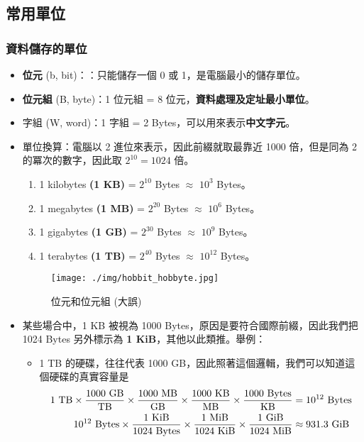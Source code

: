 \documentclass[12pt,a4paper,oneside]{report}
\begin{document}
\begin{CJK}{UTF8}{bkai}
\subsection{常用單位}
\subsubsection{資料儲存的單位}
\begin{itemize}
\item \textbf{位元} (b, bit)：：只能儲存一個 0 或 1，是電腦最小的儲存單位。
\item \textbf{位元組} (B, byte)：1 位元組 = 8 位元，\textbf{資料處理及定址最小單位}。
\item 字組 (W, word)：1 字組 = 2 Bytes，可以用來表示\textbf{中文字元}。
\item 單位換算：電腦以 2 進位來表示，因此前綴就取最靠近 1000 倍，但是同為 2 的冪次的數字，因此取 $ 2^{10} = 1024$ 倍。
  \begin{enumerate}
  \item 1 kilobytes \textbf{(1 KB)} = $2^{10}$ Bytes $\approx$ $10^{3}$ Bytes。
  \item 1 megabytes \textbf{(1 MB)} = $2^{20}$ Bytes $\approx$ $10^{6}$ Bytes。
  \item 1 gigabytes \textbf{(1 GB)} = $2^{30}$ Bytes $\approx$ $10^{9}$ Bytes。
  \item 1 terabytes \textbf{(1 TB)} = $2^{40}$ Bytes $\approx$ $10^{12}$ Bytes。
  \end{enumerate}

\begin{figure}[h!]
  \centering
  \label{fig:hobbyte}
  \texttt{[image: ./img/hobbit\_hobbyte.jpg]}
  \caption{位元和位元組 (大誤)}
\end{figure}

\item 某些場合中，1 KB 被視為 1000 Bytes，原因是要符合國際前綴，因此我們把 1024 Bytes 另外標示為 \textbf{1 KiB}，其他以此類推。舉例：
  \begin{itemize}
  \item 1 TB 的硬碟，往往代表 1000 GB，因此照著這個邏輯，我們可以知道這個硬碟的真實容量是
    \begin{align*}
      {1\text{ TB}}\times{1000\text{ GB}\over\text{TB}}\times{1000\text{ MB}\over\text{GB}}\times{1000\text{ KB}\over\text{MB}}\times{1000\text{ Bytes}\over\text{KB}}&=10^{12}\text{ Bytes}\\
      {10^{12}\text{ Bytes}}\times{1\text{ KiB}\over{1024\text{ Bytes}}}\times{1\text{ MiB}\over{1024\text{ KiB}}}\times{1\text{ GiB}\over{1024\text{ MiB}}}&\approx{}931.3\text{ GiB}
    \end{align*}
  \end{itemize}
\end{itemize}


\end{CJK}
\end{document}
